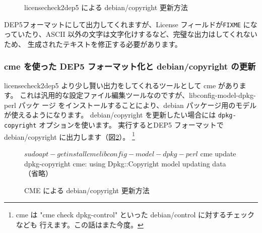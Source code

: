 \documentclass[mingoth,a4paper]{jsarticle}
\begin{document}
\begin{figure}[htbp]
\begin{center}
\end{center}
\caption{licensecheck2dep5 による debian/copyright 更新方法}
\label{fig:update-copyright-by-cdbs}
\end{figure}

DEP5フォーマットにして出力してくれますが、License フィールドが\texttt{FIXME}
になっていたり、ASCII 以外の文字は文字化けするなど、完璧な出力はしてくれないため、
生成されたテキストを修正する必要があります。

\subsubsection{cme を使った DEP5 フォーマット化と debian/copyright の更新}

licensecheck2dep5 より少し賢い出力をしてくれるツールとして cme があります。
これは汎用的な設定ファイル編集ツールなのですが、libconfig-model-dpkg-perl パッケ
ージ をインストールすることにより、debian パッケージ用のモデルが使えるようになります。
debian/copyright を更新したい場合には \texttt{dpkg-copyright} オプションを使います。
実行するとDEP5 フォーマットで debian/copyright に出力します（図\ref{fig:update-copyright}）。
\footnote{cme は "cme check dpkg-control" といった debian/control に対するチェックなども
行えます。この話はまた今度。}

\begin{figure}[htbp]
\begin{center}
\begin{commandline}
$ sudo apt-get install cme libconfig-model-dpkg-perl
$ cme update dpkg-copyright
cme: using Dpkg::Copyright model
updating data
（省略）
\end{commandline}
\end{center}
\caption{CME による debian/copyright 更新方法}
\label{fig:update-copyright}
\end{figure}
\end{document}
